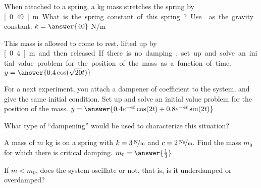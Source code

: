 \documentclass{ximera}
\begin{document}
\begin{exercise}
    When attached to a spring, a \unit[2]{kg} mass stretches the spring by \unit[0.49]{m}. 
    
    What is the spring constant of this spring? Use  as the gravity constant. $k = \answer{40}$ N/m
    \begin{problem}
        This mass is allowed to come to rest, lifted up by \unit[0.4]{m} and then released. If there is no damping, set up and solve an initial value problem for the position of the mass as a function of time. $y = \answer{0.4 \cos(\sqrt{20}t)}$
        \begin{problem}
            For a next experiment, you attach a dampener of coefficient  to the system, and give the same initial condition. Set up and solve an initial value problem for the position of the mass. $y = \answer{0.4 e^{-4t}\cos(2t) + 0.8e^{-4t}\sin(2t)}$
            \begin{problem}
                What type of ``dampening'' would be used to characterize this situation?
                \begin{multipleChoice}
                \end{multipleChoice}
            \end{problem}
        \end{problem}
    \end{problem}
\end{exercise}

\begin{exercise}%
    A mass of $m$ \unit{kg} is on a spring with $k=\unitfrac[3]{N}{m}$ and $c=\unitfrac[2]{Ns}{m}$.  Find the mass $m_0$ for which there is critical damping. $m_0 = \answer{\frac{1}{3}}$
    \begin{problem}
        If $m < m_0$, does the system oscillate or not, that is, is it underdamped or overdamped?
        \begin{multipleChoice}
        \end{multipleChoice}
    \end{problem}
\end{exercise}
\end{document}
